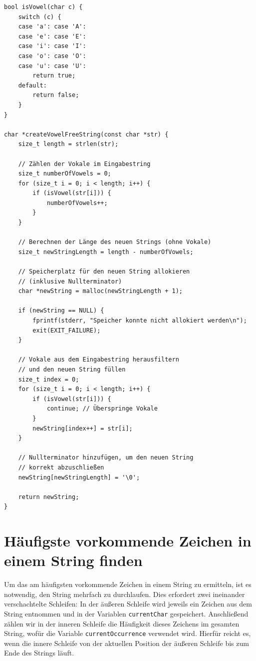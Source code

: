 \begin{verbatim}
bool isVowel(char c) {
    switch (c) {
    case 'a': case 'A':
    case 'e': case 'E':
    case 'i': case 'I':
    case 'o': case 'O':
    case 'u': case 'U':
        return true;
    default:
        return false;
    }
}

char *createVowelFreeString(const char *str) {
    size_t length = strlen(str);

    // Zählen der Vokale im Eingabestring
    size_t numberOfVowels = 0;
    for (size_t i = 0; i < length; i++) {
        if (isVowel(str[i])) {
            numberOfVowels++;
        }
    }

    // Berechnen der Länge des neuen Strings (ohne Vokale)
    size_t newStringLength = length - numberOfVowels;

    // Speicherplatz für den neuen String allokieren
    // (inklusive Nullterminator)
    char *newString = malloc(newStringLength + 1);

    if (newString == NULL) {
        fprintf(stderr, "Speicher konnte nicht allokiert werden\n");
        exit(EXIT_FAILURE);
    }

    // Vokale aus dem Eingabestring herausfiltern
    // und den neuen String füllen
    size_t index = 0;
    for (size_t i = 0; i < length; i++) {
        if (isVowel(str[i])) {
            continue; // Überspringe Vokale
        }
        newString[index++] = str[i];
    }

    // Nullterminator hinzufügen, um den neuen String
    // korrekt abzuschließen
    newString[newStringLength] = '\0';

    return newString;
}
\end{verbatim}







\chapter{Häufigste vorkommende Zeichen in einem String finden}

Um das am häufigsten vorkommende Zeichen in einem String zu ermitteln, ist es
notwendig, den String mehrfach zu durchlaufen. Dies erfordert zwei ineinander
verschachtelte Schleifen: In der äußeren Schleife wird jeweils ein Zeichen aus
dem String entnommen und in der Variablen \texttt{currentChar}
gespeichert. Anschließend zählen wir in der inneren Schleife die Häufigkeit
dieses Zeichens im gesamten String, wofür die Variable
\texttt{currentOccurrence} verwendet wird. Hierfür reicht es, wenn die
innere Schleife von der aktuellen Position der äußeren Schleife bis zum Ende des
Strings läuft.


